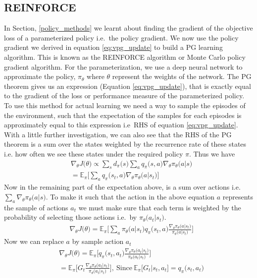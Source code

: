 \documentclass[12pt]{extarticle}
\numberwithin{equation}{section}
\begin{document}
	\subsection{REINFORCE}
	In Section, \ref{policy_methods} we learnt about finding the gradient of the objective loss of a parameterized policy i.e.\ the policy gradient. We now use the policy gradient we derived in equation \ref{eq:vpg_update} to build a PG learning algorithm. This is known as the REINFORCE algorithm or Monte Carlo policy gradient algorithm\cite{Williams92REINFORCE}. For the parameterization, we use a deep neural network to approximate the policy, $\pi_{\theta}$ where $\theta$ represent the weights of the network. The PG theorem gives us an expression (Equation \ref{eq:vpg_update}), that is exactly equal to the gradient of the loss or performance measure of the parameterized policy. To use this method for actual learning we need a way to sample the episodes of the environment, such that the expectation of the samples for each episodes is approximately equal to this expression i.e\ RHS of equation \ref{eq:vpg_update}. With a little further investigation, we can also see that the RHS of the PG theorem is a sum over the states weighted by the recurrence rate of these states i.e. how often we see these states under the required policy $\pi$. Thus we have 
	\begin{align}
	&\nabla_{\theta}J\big(\theta\big)\propto \sum_{s}d_{\pi}\big(s\big)\sum_{a}q_{\pi}\big(s,a\big)\nabla_{\theta} \pi_{\theta}\big(a|s\big)\nonumber\\
	& = \mathbb{E}_{\pi}\big[\sum_{a}q_{\pi}\big(s_t,a\big)\nabla_{\theta}\pi_{\theta}\big(a|s_t\big)\big]\label{eq:pg-expectation}
	\end{align}
	Now in the remaining part of the expectation above, is a sum over actions i.e.\ $\sum_{a}\nabla_{\theta}\pi_{\theta}\big(a|s\big)$. To make it such that the action in the above equation $a$ represents the sample of actions $a_t$ we must make sure that each term is weighted by the probability of selecting those actions i.e.\ by $\pi_{\theta}\big(a_t|s_t\big)$.
	\begin{align}
	&\nabla_{\theta}J\big(\theta\big) = \mathbb{E}_{\pi}\bigg[\sum_{a}\pi_{\theta}\big(a|s_t\big)q_{\pi}\big(s_t,a\big)\frac{\nabla_{\theta}\pi_{\theta}\big(a|s_t\big)}{\pi_{\theta}\big(a|s_t\big)} \bigg]
	\end{align}
	Now we can replace $a$ by sample action $a_t$
	\begin{align}
	&\nabla_{\theta}J\big(\theta\big) = \mathbb{E}_{\pi}\bigg[q_{\pi}\big(s_t,a_t\big)\frac{\nabla_{\theta}\pi_{\theta}\big(a_t|s_t\big)}{\pi_{\theta}\big(a_t|s_t\big)} \bigg] \nonumber \\
	&=\mathbb{E}_{\pi}\bigg[G_t\frac{\nabla_{\theta}\pi_{\theta}\big(a_t|s_t\big)}{\pi_{\theta}\big(a_t|s_t\big)} \bigg],\ \text{Since} \  \mathbb{E}_{\pi}\big[G_t|s_t,a_t\big] = q_{\pi}\big(s_t,a_t\big)
	\end{align}
\end{document}
